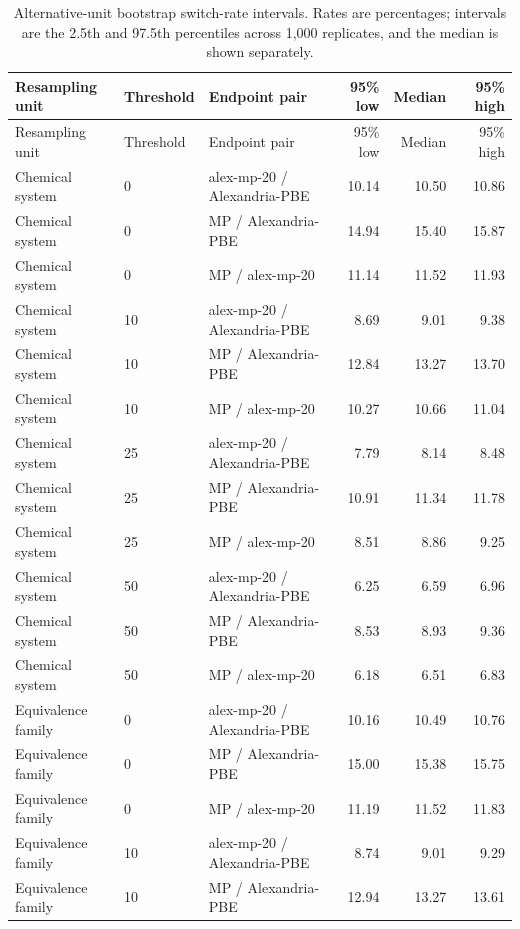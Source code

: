 \begingroup
\sitablefont
\begin{longtable}{@{}P{0.18\textwidth}P{0.08\textwidth}P{0.28\textwidth}rrr@{}}
\caption{Alternative-unit bootstrap switch-rate intervals. Rates are percentages; intervals are the 2.5th and 97.5th percentiles across 1,000 replicates, and the median is shown separately.}\label{tab:a1-switch}\\
\toprule
Resampling unit & Threshold & Endpoint pair & 95\% low & Median & 95\% high \\
\midrule
\endfirsthead
\toprule
Resampling unit & Threshold & Endpoint pair & 95\% low & Median & 95\% high \\
\midrule
\endhead
\bottomrule
\endfoot
Chemical system & 0 & alex-mp-20 / Alexandria-PBE & 10.14 & 10.50 & 10.86 \\
Chemical system & 0 & MP / Alexandria-PBE & 14.94 & 15.40 & 15.87 \\
Chemical system & 0 & MP / alex-mp-20 & 11.14 & 11.52 & 11.93 \\
Chemical system & 10 & alex-mp-20 / Alexandria-PBE & 8.69 & 9.01 & 9.38 \\
Chemical system & 10 & MP / Alexandria-PBE & 12.84 & 13.27 & 13.70 \\
Chemical system & 10 & MP / alex-mp-20 & 10.27 & 10.66 & 11.04 \\
Chemical system & 25 & alex-mp-20 / Alexandria-PBE & 7.79 & 8.14 & 8.48 \\
Chemical system & 25 & MP / Alexandria-PBE & 10.91 & 11.34 & 11.78 \\
Chemical system & 25 & MP / alex-mp-20 & 8.51 & 8.86 & 9.25 \\
Chemical system & 50 & alex-mp-20 / Alexandria-PBE & 6.25 & 6.59 & 6.96 \\
Chemical system & 50 & MP / Alexandria-PBE & 8.53 & 8.93 & 9.36 \\
Chemical system & 50 & MP / alex-mp-20 & 6.18 & 6.51 & 6.83 \\
Equivalence family & 0 & alex-mp-20 / Alexandria-PBE & 10.16 & 10.49 & 10.76 \\
Equivalence family & 0 & MP / Alexandria-PBE & 15.00 & 15.38 & 15.75 \\
Equivalence family & 0 & MP / alex-mp-20 & 11.19 & 11.52 & 11.83 \\
Equivalence family & 10 & alex-mp-20 / Alexandria-PBE & 8.74 & 9.01 & 9.29 \\
Equivalence family & 10 & MP / Alexandria-PBE & 12.94 & 13.27 & 13.61 \\

\end{longtable}
